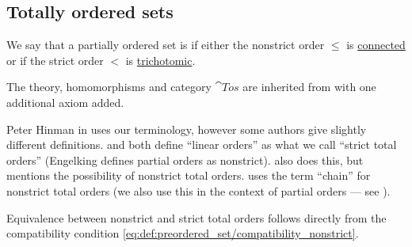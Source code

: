 \subsection{Totally ordered sets}\label{subsec:totally_ordered_sets}

\begin{definition}\label{def:totally_ordered_set}\cite[def. 2.1.1(ii)]{Hinman2005}
  We say that a partially ordered set is  if either the nonstrict order \( \leq \) is \hyperref[def:binary_relation/connected]{connected} or if the strict order \( < \) is \hyperref[def:binary_relation/trichotomic]{trichotomic}.

  The theory, homomorphisms and category \( \cat{Tos} \) are inherited from  with one additional axiom added.
\end{definition}
\begin{comments}
  \item Peter Hinman in  uses our terminology, however some authors give slightly different definitions.  and  both define \enquote{linear orders} as what we call \enquote{strict total orders} (Engelking defines partial orders as nonstrict).  also does this, but mentions the possibility of nonstrict total orders.  uses the term \enquote{chain} for nonstrict total orders (we also use this in the context of partial orders --- see ).
\end{comments}
\begin{defproof}
  Equivalence between nonstrict and strict total orders follows directly from the compatibility condition \eqref{eq:def:preordered_set/compatibility_nonstrict}.
\end{defproof}

